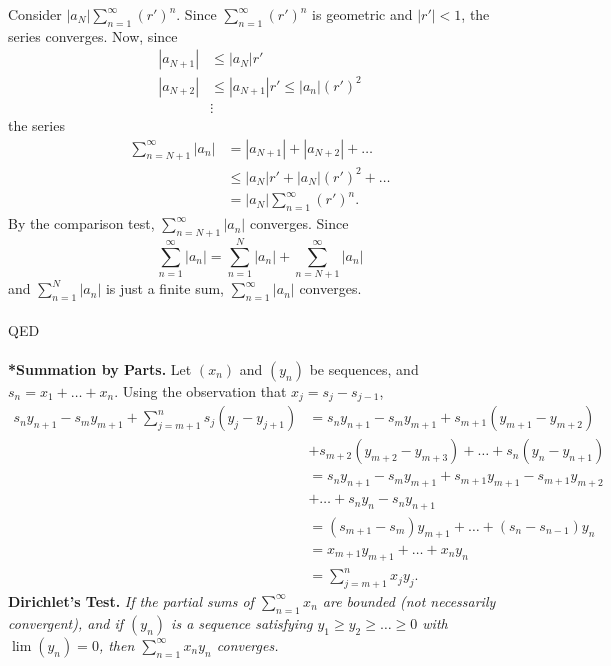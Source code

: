 \documentclass{article}
\begin{document}
            Consider $|a_N|\sum_{n=1}^\infty (r')^n$. Since $\sum_{n=1}^\infty (r')^n$ is geometric and $|r'|<1$, the series converges. Now, since
            \begin{align*}
                |a_{N+1}| & \leq |a_N|r' \\
                |a_{N+2}| & \leq |a_{N+1}|r' \leq |a_n|(r')^2 \\
                & \vdots
            \end{align*}
            the series
            \begin{align*}
                \sum_{n=N+1}^\infty |a_n| & = |a_{N+1}| + |a_{N+2}| + \dots \\
                & \leq |a_N|r' + |a_N|(r')^2 + \dots \\
                & =|a_N|\sum_{n=1}^\infty (r')^n.
            \end{align*}
            By the comparison test, $\sum_{n=N+1}^\infty |a_n|$ converges. Since
            \begin{equation*}
                \sum_{n=1}^\infty |a_n| = \sum_{n=1}^N |a_n| + \sum_{n=N+1}^\infty |a_n|
            \end{equation*}
            and $\sum_{n=1}^N |a_n|$ is just a finite sum, $\sum_{n=1}^\infty |a_n|$ converges.
            \\ \\
            QED
            \\ \\
            \textbf{*Summation by Parts.} Let $(x_n)$ and $(y_n)$ be sequences, and $s_n = x_1 + \dots + x_n$. Using the observation that $x_j = s_j - s_{j-1}$,
            \begin{align*}
                s_n y_{n+1} - s_m y_{m+1} + \sum_{j=m+1}^n s_j(y_j-y_{j+1}) & = s_n y_{n+1} - s_m y_{m+1} + s_{m+1} (y_{m+1}-y_{m+2}) \\ 
                & + s_{m+2}(y_{m+2}-y_{m+3}) + \dots + s_{n}(y_{n}-y_{n+1}) \\
                & = s_n y_{n+1} - s_m y_{m+1} + s_{m+1} y_{m+1} - s_{m+1} y_{m+2} \\
                & + \dots + s_n y_n - s_n y_{n+1} \\
                & = (s_{m+1}-s_m)y_{m+1} + \dots + (s_n-s_{n-1}) y_n \\
                & = x_{m+1}y_{m+1} + \dots + x_n y_n \\
                & = \sum_{j=m+1}^n x_j y_j.
            \end{align*}
            \textbf{Dirichlet's Test.} \textit{If the partial sums of $\sum_{n=1}^\infty x_n$ are bounded (not necessarily convergent), and if $(y_n)$ is a sequence satisfying $y_1 \geq y_2 \geq \dots \geq 0$ with $\lim(y_n)=0$, then $\sum_{n=1}^\infty x_n y_n$ converges.}
\end{document}

